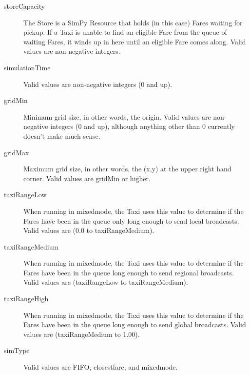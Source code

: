 \documentclass[11pt,letterpaper,onecolumn,twoside,openright,final]{report}
\begin{document}
\begin{description}
\item[storeCapacity]The Store is a SimPy Resource that holds (in this case) Fares waiting for pickup.
If a Taxi is unable to find an eligible Fare from the queue of waiting Fares, it winds up in here until an eligible Fare comes along.
Valid values are non-negative integers.

\item[simulationTime]
Valid values are non-negative integers (0 and up).

\item[gridMin]Minimum grid size, in other words, the origin.
Valid values are non-negative integers (0 and up), although anything other than 0 currently doesn't make much sense.

\item[gridMax]Maximum grid size, in other words, the (x,y) at the upper right hand corner.
Valid values are gridMin or higher.

\item[taxiRangeLow]When running in mixedmode, the Taxi uses this value to determine if the Fares have been in the queue only long enough to send local broadcasts.
Valid values are (0.0 to taxiRangeMedium).

\item[taxiRangeMedium]When running in mixedmode, the Taxi uses this value to determine if the Fares have been in the queue long enough to send regional broadcasts.
Valid values are (taxiRangeLow to taxiRangeMedium).

\item[taxiRangeHigh]When running in mixedmode, the Taxi uses this value to determine if the Fares have been in the queue long enough to send global broadcasts.
Valid values are (taxiRangeMedium to 1.00).

\item[simType]Valid values are FIFO, closestfare, and mixedmode.


\end{description}
\end{document}
